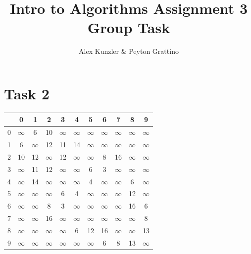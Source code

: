 \documentclass[12pt]{amsart}
\title{Intro to Algorithms Assignment 3 Group Task}
\author{Alex Kunzler \& Peyton Grattino}
\date{} %
\begin{document}
\maketitle
\tableofcontents
{}

\pagebreak
\setcounter{secnumdepth}{1}
\section{Task 2}
\begin{center}
\begin{tabular}{| c | c | c | c | c | c | c | c | c | c | c |}
\hline
& 0 & 1 & 2 & 3 & 4 & 5 & 6 & 7 & 8 & 9 \\
\hline
0 & $\infty$ & 6 & 10 & $\infty$ & $\infty$ & $\infty$ & $\infty$ & $\infty$ & $\infty$ & $\infty$ \\
\hline
1 & 6 & $\infty$ & 12 & 11 & 14 & $\infty$ & $\infty$ & $\infty$ & $\infty$ & $\infty$ \\
\hline
2 & 10 & 12 & $\infty$ & 12 & $\infty$ & $\infty$ & 8 & 16 & $\infty$ & $\infty$ \\
\hline
3 & $\infty$ & 11 & 12 & $\infty$ & $\infty$ & 6 & 3 & $\infty$ & $\infty$ & $\infty$ \\
\hline
4 & $\infty$ & 14 & $\infty$ & $\infty$ & $\infty$ & 4 & $\infty$ & $\infty$ & 6 & $\infty$ \\
\hline
5 & $\infty$ & $\infty$ & $\infty$ & 6 & 4 & $\infty$ & $\infty$ & $\infty$ & 12 & $\infty$ \\
\hline
6 & $\infty$ & $\infty$ & 8 & 3 & $\infty$ & $\infty$ & $\infty$ & $\infty$ & 16 & 6 \\
\hline
7 & $\infty$ & $\infty$ & 16 & $\infty$ & $\infty$ & $\infty$ & $\infty$ & $\infty$ & $\infty$ & 8 \\
\hline
8 & $\infty$ & $\infty$ & $\infty$ & $\infty$ & 6 & 12 &16 & $\infty$ & $\infty$ & 13 \\
\hline
9 & $\infty$ & $\infty$ & $\infty$ & $\infty$ & $\infty$ & $\infty$ & 6 & 8 & 13 & $\infty$ \\
\hline
\end{tabular}
\end{center}
\leavevmode
\end{document}
